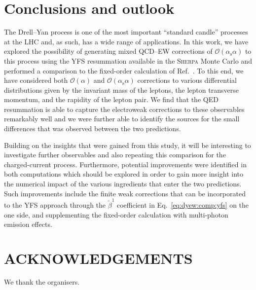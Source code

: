 \documentclass[11pt]{cernrep}
\newcommand{\order}{\ensuremath{\mathcal{O}}}
\newcommand{\alphas}{\ensuremath{\alpha_\mathrm{s}}}
\begin{document}
\section{Conclusions and outlook}
\label{sec:dyew:conclusions}

The Drell--Yan process is one of the most important ``standard candle'' 
processes at the LHC and, as such, has a wide range of applications.
In this work, we have explored the possibility of generating mixed 
QCD--EW corrections of $\order(\alphas\alpha)$ to this process using 
the YFS resummation available in the \textsc{Sherpa} Monte Carlo and 
performed a comparison to the fixed-order calculation of 
Ref.~\cite{Dittmaier:2015rxo}. To this end, we have considered both 
$\order(\alpha)$ and $\order(\alphas\alpha)$ corrections to various 
differential distributions given by the invariant mass of the leptons, 
the lepton transverse momentum, and the rapidity of the lepton pair.
We find that the QED resummation is able to capture the electroweak 
corrections to these observables remarkably well and we were further 
able to identify the sources for the small differences that was 
observed between the two predictions.

Building on the insights that were gained from this study, it will 
be interesting to investigate further observables and also repeating 
this comparison for the charged-current process. Furthermore, potential 
improvements were identified in both computations which should be 
explored in order to gain more insight into the numerical impact of 
the various ingredients that enter the two predictions. Such 
improvements include the finite weak corrections that can be 
incorporated to the YFS approach through the $\tilde{\beta}^1$ 
coefficient in Eq.~\eqref{eq:dyew:comp:yfs} on the one side, and 
supplementing the fixed-order calculation with multi-photon emission 
effects. 


\section*{ACKNOWLEDGEMENTS}

We thank the organisers.


\end{document}
